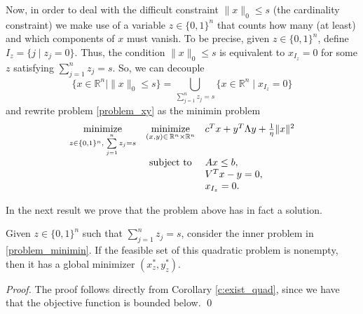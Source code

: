 \documentclass[smallextended,referee,envcountsect]{svjour3}
\newcommand{\R}{\mathbb{R}}
\begin{document}
Now, in order to deal with the difficult constraint $\|x\|_0\leq s$ (the cardinality 
constraint) we make use of a variable $z\in\{0,1\}^n$ that counts how many (at least) 
and which components of $x$ must vanish. To be precise, given $z\in\{0,1\}^n$, define 
$I_z=\{j\mid{z_j}=0\}$. Thus, the condition $\|x\|_0\leq s$ is equivalent 
to $x_{I_z}=0$ for some $z$ satisfying $\sum\limits_{j=1}^{n}z_j=s$. So, we can 
decouple 
\begin{equation}
\label{decomposition}
\{x\in\R^n\mid\|x\|_0\leq s\}=
\bigcup_{\sum\limits_{j=1}^{n}z_j=s}\{x\in\R^n\mid{x_{I_z}}=0\}
\end{equation}
and rewrite problem \eqref{problem_xy} as the minimin problem 
\begin{equation}
\label{problem_minimin}
\begin{array}{ccl}
\displaystyle\mathop{\rm minimize}_{z\in\{0,1\}^n,\;\sum\limits_{j=1}^{n}z_j=s} & 
\displaystyle\mathop{\rm minimize}_{(x,y)\in\,\R^n\times\R^n} & 
c^Tx+y^T\Lambda y+\textstyle\frac{1}{\eta}\|x\|^2 \\ 
& {\rm subject\ to} & Ax\leq b, \\ 
& & V^Tx-y = 0, \\ 
& & x_{I_z}=0.
\end{array}
\end{equation}

In the next result we prove that the problem above has in fact a solution. 

\begin{lemma}
\label{lm:exist_inner_primal}
Given $z\in\{0,1\}^n$ such that $\sum\limits_{j=1}^{n}z_j=s$, consider 
the inner problem in \eqref{problem_minimin}. If the feasible set of this quadratic 
problem is nonempty, then it has a global minimizer $(x_z^*,y_z^*)$.
\end{lemma}
\begin{proof}
The proof follows directly from Corollary \ref{c:exist_quad}, since we have 
that the objective function is bounded below.
\qed\end{proof}
\end{document}
